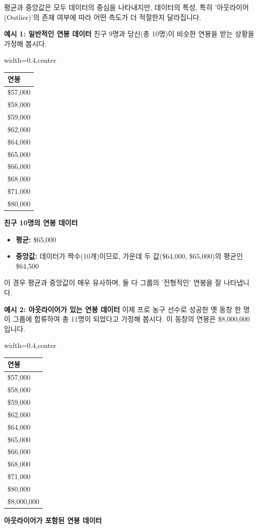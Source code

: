 \documentclass[11pt,a4paper]{book}
\providecommand{\captionof}[2]{\textbf{#2}}
\theoremstyle{definition}
\begin{document}
\begin{infobox}[title=어떤 중심 경향성 측도를 사용할 것인가? (평균 vs. 중앙값)]
평균과 중앙값은 모두 데이터의 중심을 나타내지만, 데이터의 특성, 특히 '아웃라이어(Outlier)'의 존재 여부에 따라 어떤 측도가 더 적절한지 달라집니다.

\textbf{예시 1: 일반적인 연봉 데이터}
친구 9명과 당신(총 10명)이 비슷한 연봉을 받는 상황을 가정해 봅시다.
\begin{adjustbox}{width=0.4\textwidth,center}
\begin{tabular}{l}
\toprule
\textbf{연봉} \\
\midrule
\$57,000 \\
\$58,000 \\
\$59,000 \\
\$62,000 \\
\$64,000 \\
\$65,000 \\
\$66,000 \\
\$68,000 \\
\$71,000 \\
\$80,000 \\
\bottomrule
\end{tabular}
\end{adjustbox}
\captionof{table}{친구 10명의 연봉 데이터}
\label{tab:salary_example1}

\begin{itemize}
    \item \textbf{평균:} \$65,000
    \item \textbf{중앙값:} 데이터가 짝수(10개)이므로, 가운데 두 값(\$64,000, \$65,000)의 평균인 \$64,500
\end{itemize}
이 경우 평균과 중앙값이 매우 유사하며, 둘 다 그룹의 '전형적인' 연봉을 잘 나타냅니다.

\textbf{예시 2: 아웃라이어가 있는 연봉 데이터}
이제 프로 농구 선수로 성공한 옛 동창 한 명이 그룹에 합류하여 총 11명이 되었다고 가정해 봅시다. 이 동창의 연봉은 \$8,000,000입니다.
\begin{adjustbox}{width=0.4\textwidth,center}
\begin{tabular}{l}
\toprule
\textbf{연봉} \\
\midrule
\$57,000 \\
\$58,000 \\
\$59,000 \\
\$62,000 \\
\$64,000 \\
\$65,000 \\
\$66,000 \\
\$68,000 \\
\$71,000 \\
\$80,000 \\
\$8,000,000 \\
\bottomrule
\end{tabular}
\end{adjustbox}
\captionof{table}{아웃라이어가 포함된 연봉 데이터}
\label{tab:salary_example2}


\end{infobox}
\end{document}
